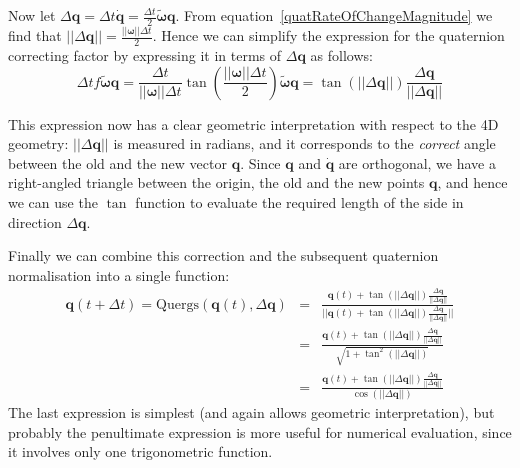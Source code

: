 Now let $\Delta \mathbf{q} = \Delta t \dot{\mathbf{q}} =
    \frac{\Delta t}{2} \tilde{\bm{\omega}} \mathbf{q}$.
From equation~\ref{quatRateOfChangeMagnitude} we find that
$||\Delta\mathbf{q}|| = \frac{||\bm{\omega}||\Delta t}{2}$.
Hence we can simplify the expression for the quaternion correcting factor by expressing it
in terms of $\Delta \mathbf{q}$ as follows:
$$
\Delta t f \tilde{\bm{\omega}}\mathbf{q} = \frac{\Delta t}{||\bm{\omega}||\Delta t}
    \tan\left(\frac{||\bm{\omega}||\Delta t}{2}\right) \tilde{\bm{\omega}} \mathbf{q} =
    \tan\left(||\Delta\mathbf{q}||\right) \frac{\Delta\mathbf{q}}{||\Delta\mathbf{q}||}
$$

This expression now has a clear geometric interpretation with respect to the 4D geometry:
$||\Delta\mathbf{q}||$ is measured in radians, and it corresponds to the {\em correct}
angle between the old and the new vector $\mathbf{q}$. Since $\mathbf{q}$ and
$\dot{\mathbf{q}}$ are orthogonal, we have a right-angled triangle between the origin,
the old and the new points $\mathbf{q}$, and hence we can use the $\tan$ function to
evaluate the required length of the side in direction $\Delta\mathbf{q}$.

Finally we can combine this correction and the subsequent quaternion normalisation into
a single function:
\begin{eqnarray*}
\mathbf{q}(t+\Delta t) = \mathrm{Quergs}(\mathbf{q}(t), \Delta\mathbf{q}) &=&
    \frac{\mathbf{q}(t) + \tan\left(||\Delta\mathbf{q}||\right)
        \frac{\Delta\mathbf{q}}{||\Delta\mathbf{q}||}}{
    ||\mathbf{q}(t) + \tan\left(||\Delta\mathbf{q}||\right)
        \frac{\Delta\mathbf{q}}{||\Delta\mathbf{q}||}||} \\
&=& \frac{\mathbf{q}(t) + \tan\left(||\Delta\mathbf{q}||\right)
        \frac{\Delta\mathbf{q}}{||\Delta\mathbf{q}||}}{
    \sqrt{1 + \tan^2\left(||\Delta\mathbf{q}||\right)}} \\
&=& \frac{\mathbf{q}(t) + \tan\left(||\Delta\mathbf{q}||\right)
        \frac{\Delta\mathbf{q}}{||\Delta\mathbf{q}||}}{
    \cos\left(||\Delta\mathbf{q}||\right)}
\end{eqnarray*}
The last expression is simplest (and again allows geometric interpretation), but probably
the penultimate expression is more useful for numerical evaluation, since it involves only
one trigonometric function.
